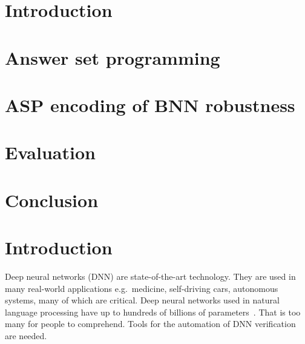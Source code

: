 \documentclass[
    digital,
    color,
    oneside,
    sansbold,
    lot,
    nolof
]{fithesis}
\begin{document}

\chapter{Introduction}



\chapter{Answer set programming}

\chapter{ASP encoding of BNN robustness}

\chapter{Evaluation}

\chapter{Conclusion}


\chapter{Introduction}


Deep neural networks (DNN) are state-of-the-art technology. They are used in many
real-world applications e.g.\ medicine, self-driving cars, autonomous systems,
many of which are critical. %
Deep neural networks used in natural language processing have up to hundreds of
billions of parameters~\cite{2021arXiv210901652W}.
That is too many for people to comprehend. Tools for the automation
of DNN verification are needed.
\end{document}
